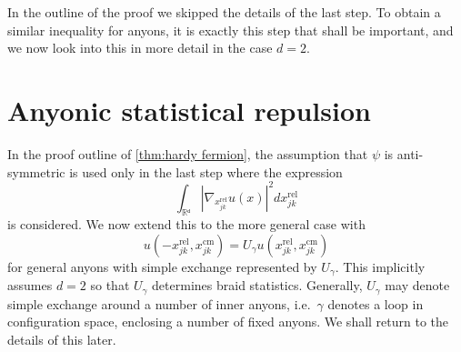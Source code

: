 In the outline of the proof we skipped the details of the last step. To obtain a similar inequality for anyons, it is exactly this step that shall be important, and we now look into this in more detail in the case $d = 2$.














\section{Anyonic statistical repulsion}

In the proof outline of \cref{thm:hardy fermion}, the assumption that $ψ$ is anti-symmetric is used only in the last step where the expression
\begin{equation}
  ∫_{ℝᵈ} \left|∇_{x_{jk}^\text{rel}} u(x) \right|^2 dx_{jk}^\text{rel}
\end{equation}
is considered. We now extend this to the more general case with
\begin{equation}\label{eq:rel boundary cond}
  u(-x_{jk}^\text{rel}, x_{jk}^\text{cm}) = U_γ u(x_{jk}^\text{rel}, x_{jk}^\text{cm})
\end{equation}
for general anyons with simple exchange represented by $U_γ$. This implicitly assumes $d = 2$ so that $U_γ$ determines braid statistics. Generally, $U_γ$ may denote simple exchange around a number of inner anyons, i.e.\ $γ$ denotes a loop in configuration space, enclosing a number of fixed anyons. We shall return to the details of this later.

